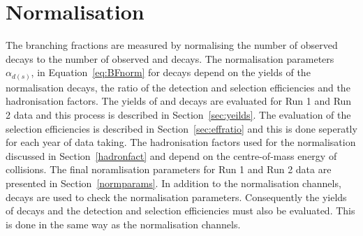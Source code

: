 {{\section{Normalisation}
\label{sec:Normalisation}

The \bmumu branching fractions are measured by normalising the number of observed \bmumu decays to the number of observed \bujpsik and \bdkpi decays. 
The normalisation parameters $\alpha_{d(s)}$, in Equation~\ref{eq:BFnorm} for \bmumu decays depend on the yields of the normalisation decays, the ratio of the detection and selection efficiencies and the hadronisation factors. 
The yields of \bujpsik and \bdkpi decays are evaluated for Run 1 and Run 2 data and this process is described in Section~\ref{sec:yeilds}. 
The evaluation of the selection efficiencies is described in Section~\ref{sec:effratio} and this is done seperatly for each year of data taking.
The hadronisation factors used for the normalisation discussed in Section~\ref{hadronfact} and depend on the centre-of-mass energy of collisions.
The final noramlisation parameters for Run 1 and Run 2 data are presented in Section~\ref{normparams}.
In addition to the normalisation channels, \bsjpsiphi decays are used to check the normalisation parameters. Consequently the yields of \bsjpisphi decays and the detection and selection efficiencies must also be evaluated. This is done in the same way as the normalisation channels.





}}
